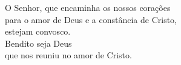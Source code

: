 O Senhor, que encaminha os nossos corações \\ para o amor de Deus e a constância de Cristo, \\ estejam convosco. \\
\RbarRed{} Bendito seja Deus \\ que nos reuniu no amor de Cristo.
\vspace{.2cm} \\

